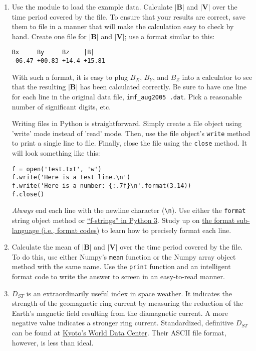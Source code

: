 \documentclass[12pt, letterpaper]{article}
\begin{document}
\begin{enumerate}
\item Use the module to load the example data.  Calculate 
  $|\mathbf{B}|$ and $|\mathbf{V}|$ over the time period covered by the file.
  To ensure that your results are correct, save them to file in a manner that
  will make the calculation easy to check by hand.  Create one file
  for $|\mathbf{B}|$ and $|\mathbf{V}|$; use a format similar to this:
\begin{verbatim}
Bx     By     Bz    |B|
-06.47 +00.83 +14.4 +15.81
\end{verbatim}
With such a format, it is easy to plug $B_X$, $B_Y$, and $B_Z$ into a
calculator to see that  the resulting $|\mathbf{B}|$ has been calculated
correctly.
Be sure to have one line for each line in the original data file, 
{\tt imf\_aug2005 .dat}.  Pick a reasonable number of significant digits, etc. 

Writing files in Python is straightforward.  Simply create a file object
using 'write' mode instead of 'read' mode.  Then, use the file object's
{\tt write} method to print a single line to file. Finally, close the file
using the {\tt close} method.  It will look something like this:
\begin{verbatim}
f = open('test.txt', 'w')
f.write('Here is a test line.\n')
f.write('Here is a number: {:.7f}\n'.format(3.14))
f.close()
\end{verbatim}
\emph{Always} end each line with the newline character ({\tt \textbackslash n}).
Use either the {\tt format} string object method or
\href{https://docs.python.org/3/tutorial/inputoutput.html#tut-f-strings}{``f-strings'' in Python 3}.
Study up on \href{https://docs.python.org/3/library/string.html#formatspec}{the format sub-language (i.e., format codes)} to learn how to precisely format each line.

\item Calculate the mean of $|\mathbf{B}|$ and $|\mathbf{V}|$ over the time
  period covered by the file.  To do this, use either Numpy's {\tt mean}
  function or the Numpy array object method with the same name.
  Use the {\tt print} function and an intelligent format code to write the
  answer to screen in an easy-to-read manner.  

\item $D_{ST}$ is an extraordinarily useful index in space weather.  It
  indicates the strength of the geomagnetic ring current by measuring the
  reduction of the Earth's magnetic field resulting from the diamagnetic
  current.  A more negative value indicates a stronger ring 
  current.  Standardized, definitive $D_{ST}$ can be found at
  \href{http://wdc.kugi.kyoto-u.ac.jp/}{Kyoto's World Data Center}.
  Their ASCII file format, however, is less than ideal.


\end{enumerate}
\end{document}
